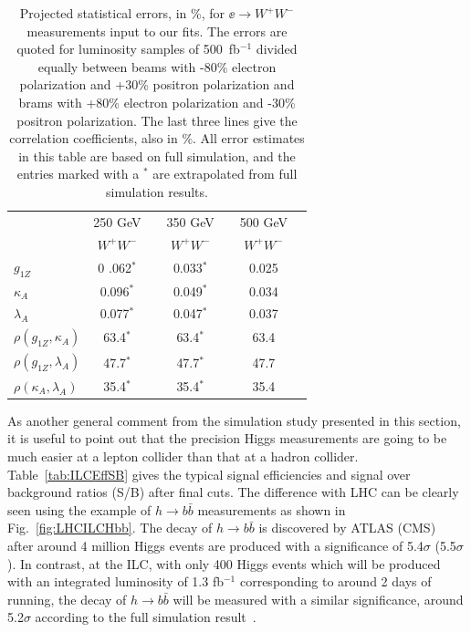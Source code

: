 \begin{table}
\begin{center}
\begin{tabular} {lcccccc}
 & 250 GeV   &  & 350 GeV & & 500 GeV  &  \\
 &  $ W^+ W^-$  &  &  $ W^+ W^-$  &  &  $ W^+ W^-$  & \\
 \hline
$g_{1Z}$ & 0 .062$^*$&   &0.033$^*$ &  &0.025  &  \\
$\kappa_A $ & 0.096$^*$ &   & 0.049$^*$  &   & 0.034 &  \\
$\lambda_A$ &   0.077$^*$ &   &0.047$^*$  &  &0.037  &  \\
$\rho(g_{1Z},\kappa_A)$ & 63.4$^*$ &   &63.4$^*$  &  & 63.4 &  \\
$\rho(g_{1Z},\lambda_A)$ &  47.7$^*$ &   & 47.7$^*$  &  &47.7  &  \\
$\rho(\kappa_A,\lambda_A)$ & 35.4$^*$  &   & 35.4$^*$  &  & 35.4  &  
\end{tabular}
\caption{Projected statistical errors, in \%, for $\ee\to W^+W^-$
measurements input to our fits. The errors are 
quoted for luminosity samples of 500~fb$^{-1}$   divided equally
between beams with 
 -80\% electron polarization and +30\% positron
  polarization and  brams with  +80\% electron polarization and -30\% positron
  polarization. The last three lines give the correlation
  coefficients, also in \%.  All error estimates in this table are
based on full simulation, and the entries marked with a $^*$ are 
extrapolated from full simulation results. }
\label{tab:WWerrors}
\end{center}
\end{table}

As another general comment from the simulation study presented in this section, 
it is useful to point out that the precision Higgs measurements 
are going to be much easier at a lepton collider than that at a hadron collider.
Table~\ref{tab:ILCEffSB} gives the typical signal efficiencies and signal over
background ratios (S/B) after final cuts. The difference with
LHC can be clearly seen using the example of $h\to b\bar{b}$ measurements
as shown in Fig.~\ref{fig:LHCILCHbb}. The decay of $h\to b\bar{b}$
is discovered by ATLAS (CMS)~\cite{} after around 4 million Higgs events are produced
with a significance of 5.4$\sigma$ (5.5$\sigma$). In contrast, at the ILC, 
with only 400 Higgs events which will be produced with an integrated luminosity of 1.3 fb$^{-1}$
corresponding to around 2 days of running, the decay of $h\to b\bar{b}$ will be 
measured with a similar significance, around 5.2$\sigma$ according to the full 
simulation result~\cite{}.


